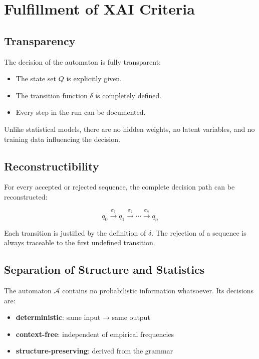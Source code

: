 \documentclass[
  12pt,
  a4paper,
  oneside,
  titlepage
]{article}
\begin{document}
\section{Fulfillment of XAI Criteria}

\subsection{Transparency}

The decision of the automaton is fully transparent:

\begin{itemize}
    \item The state set \(Q\) is explicitly given.
    \item The transition function \(\delta\) is completely defined.
    \item Every step in the run can be documented.
\end{itemize}

Unlike statistical models, there are no hidden weights, no latent variables, 
and no training data influencing the decision.

\subsection{Reconstructibility}

For every accepted or rejected sequence, the complete decision path can be 
reconstructed:

\[
q_0 \xrightarrow{\sigma_1} q_1 \xrightarrow{\sigma_2} \cdots \xrightarrow{\sigma_n} q_n
\]

Each transition is justified by the definition of \(\delta\). The rejection of 
a sequence is always traceable to the first undefined transition.

\subsection{Separation of Structure and Statistics}

The automaton \(\mathcal{A}\) contains no probabilistic information whatsoever. 
Its decisions are:

\begin{itemize}
    \item \textbf{deterministic}: same input → same output
    \item \textbf{context-free}: independent of empirical frequencies
    \item \textbf{structure-preserving}: derived from the grammar
\end{itemize}
\end{document}
